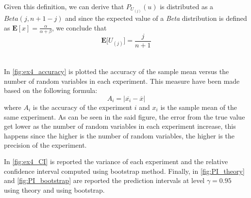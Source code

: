 \documentclass[11pt,a4paper]{article}
\begin{document}
Given this definition, we can derive that $P_{U_{(j)}}(u)$ is distributed as a $Beta(j,n+1-j)$ and since the expected value of a \textit{Beta} distribution is defined as $\mathbf{E}[x] = \frac{\alpha}{\alpha+\beta}$, we conclude that
\begin{equation}
  \label{eq:ex_value}
  \mathbf{E}\bigg[U_{(j)}\bigg] = \frac{j}{n+1}
\end{equation}

\section{}

In \autoref{fig:ex4_accuracy} is plotted the accuracy of the sample mean versus the number of random variables in each experiment. This measure have been made based on the following formula:
\begin{equation}
  A_i = |\overline{x_i} - \overline{x}|
\end{equation}
where $A_i$ is the accuracy of the experiment $i$ and $x_i$ is the sample mean of the same experiment. As can be seen in the said figure, the error from the true value get lower as the number of random variables in each experiment increase, this happens since the higher is the number of random variables, the higher is the precision of the experiment.

In \autoref{fig:ex4_CI} is reported the variance of each experiment and the relative confidence interval computed using bootstrap method.
Finally, in \autoref{fig:PI_theory} and \autoref{fig:PI_bootstrap} are reported the prediction intervals at level $\gamma = 0.95$ using theory and using bootstrap.
\end{document}
